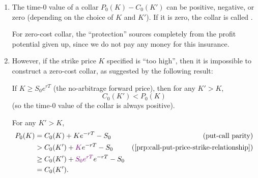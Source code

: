 \begin{enumerate}
\item The time-0 value of a collar \(P_0(K)-C_0(K')\) can be positive,
negative, or zero (depending on the choice of \(K\) and \(K'\)). If it is zero,
the collar is called .

\begin{intuition}
For zero-cost collar, the ``protection'' sources completely from the profit
potential given up, since we do not pay any money for this insurance.
\end{intuition}

\item However, if the strike price \(K\) specified is ``too high'', then it is
impossible to construct a zero-cost collar, as suggested by the following
result:
\begin{proposition}
\label{prp:k-high-collar-val-positive}
If \(K\ge S_0e^{rT}\) (the no-arbitrage forward price), then for any \(K'>K\),
\[
C_0(K')<P_0(K)
\]
(so the time-0 value of the collar is always positive).
\end{proposition}
\begin{pf}
For any \(K'>K\),
\begin{align*}
P_0(K)&=C_0(K)+Ke^{-rT}-S_0&\text{(put-call parity)}\\
&>C_0(K')+{\color{violet}K}e^{-rT}-S_0&\text{(\cref{prp:call-put-price-strike-relationship})}\\
&\ge C_0(K')+{\color{violet}S_0e^{rT}}e^{-rT}-S_0\\
&=C_0(K').
\end{align*}
\end{pf}
\end{enumerate}
